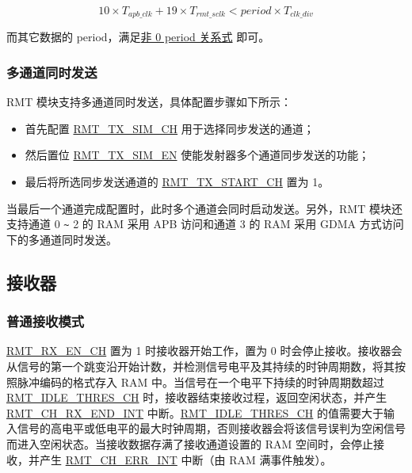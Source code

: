 \documentclass[main\_\_CN.tex]{subfiles}
\begin{document}
\begin{equation}
10 \times T_{apb\_clk} + 19 \times T_{rmt\_sclk} < period \times T_{clk\_div}
\end{equation}

而其它数据的 period，满足\hyperref[eq:rmt-period-value]{非 0 period 关系式} 即可。


\subsubsection{多通道同时发送}

RMT 模块支持多通道同时发送，具体配置步骤如下所示：
\begin{itemize}
    \item 首先配置 \hyperref[fielddesc:RMTTXSIMCHN]{RMT\_TX\_SIM\_CH} 用于选择同步发送的通道；
    \item 然后置位 \hyperref[fielddesc:RMTTXSIMEN]{RMT\_TX\_SIM\_EN} 使能发射器多个通道同步发送的功能；
    \item 最后将所选同步发送通道的 \hyperref[fielddesc:RMTTXSTARTCHN]{RMT\_TX\_START\_CH} 置为 1。
\end{itemize}
当最后一个通道完成配置时，此时多个通道会同时启动发送。另外，RMT 模块还支持通道 0 \verb+~+ 2 的 RAM 采用 APB 访问和通道 3 的 RAM 采用 GDMA 方式访问下的多通道同时发送。


\subsection{接收器}

\subsubsection{普通接收模式}\label{sec:normal-rx-mode}

\hyperref[fielddesc:RMTRXENCHM]{RMT\_RX\_EN\_CH} 置为 1 时接收器开始工作，置为 0 时会停止接收。接收器会从信号的第一个跳变沿开始计数，并检测信号电平及其持续的时钟周期数，将其按照脉冲编码的格式存入 RAM 中。当信号在一个电平下持续的时钟周期数超过 \hyperref[fielddesc:RMTIDLETHRESCHM]{RMT\_IDLE\_THRES\_CH} 时，接收器结束接收过程，返回空闲状态，并产生 \hyperref[int:RMTCHMRXENDINT]{RMT\_CH\_RX\_END\_INT} 中断。\hyperref[fielddesc:RMTIDLETHRESCHM]{RMT\_IDLE\_THRES\_CH} 的值需要大于输入信号的高电平或低电平的最大时钟周期，否则接收器会将该信号误判为空闲信号而进入空闲状态。当接收数据存满了接收通道设置的 RAM 空间时，会停止接收，并产生 \hyperref[int:RMTCHNERRINT]{RMT\_CH\_ERR\_INT} 中断（由 RAM 满事件触发）。
\end{document}
